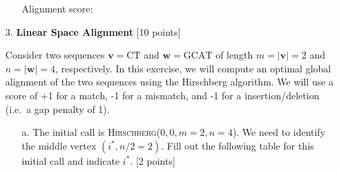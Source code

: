 \begin{enumerate}
\begin{enumerate}
{{\vspace{.5cm}
\begin{center}
\end{center}
\vspace{.5cm}


Alignment score:  \underline{    \quad \quad   }
}}
\end{enumerate}


\clearpage


\item[3.] \textbf{Linear Space Alignment} [10 points]

Consider two sequences $\mathbf{v} = \mathrm{CT}$ and $\mathbf{w} = \mathrm{GCAT}$ of length $m = |\mathbf{v}| = 2$ and $n = |\mathbf{w}| = 4$, respectively.
In this exercise, we will compute an optimal global alignment of the two sequences using the Hirschberg algorithm.
We will use a score of +1 for a match, -1 for a mismatch, and -1 for a insertion/deletion (i.e.\ a gap penalty of 1).

\begin{enumerate}
  \item[a.] The initial call is \textsc{Hirschberg}($0,0,m=2,n=4$). We need to identify the middle vertex $(i^*,n/2=2)$. Fill out the following table for this initial call and indicate $i^*$. [2 points]
\\[.5em]
\fbox{\parbox{\linewidth}{


}}
\end{enumerate}
\end{enumerate}
